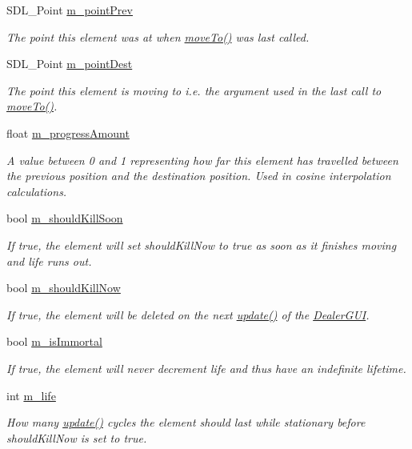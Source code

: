 \begin{DoxyCompactItemize}
S\-D\-L\-\_\-\-Point \hyperlink{classGUI_1_1Element_abc7a9c575911f5260732cdb0d63afb58}{m\-\_\-point\-Prev}
\begin{DoxyCompactList}\small\item\em The point this element was at when \hyperlink{classGUI_1_1Element_a6f7171736744f64faf428c17c74695df}{move\-To()} was last called. \end{DoxyCompactList}\item 
S\-D\-L\-\_\-\-Point \hyperlink{classGUI_1_1Element_a10ec38c0cf88fddea487644c1de45e1e}{m\-\_\-point\-Dest}
\begin{DoxyCompactList}\small\item\em The point this element is moving to i.\-e. the argument used in the last call to \hyperlink{classGUI_1_1Element_a6f7171736744f64faf428c17c74695df}{move\-To()}. \end{DoxyCompactList}\item 
float \hyperlink{classGUI_1_1Element_ae695e5eedb37b27ef5d8542a15908f1e}{m\-\_\-progress\-Amount}
\begin{DoxyCompactList}\small\item\em A value between 0 and 1 representing how far this element has travelled between the previous position and the destination position. Used in cosine interpolation calculations. \end{DoxyCompactList}\item 
bool \hyperlink{classGUI_1_1Element_a5a4b537de0a51fa11eb4c59b43980092}{m\-\_\-should\-Kill\-Soon}
\begin{DoxyCompactList}\small\item\em If true, the element will set should\-Kill\-Now to true as soon as it finishes moving and life runs out. \end{DoxyCompactList}\item 
bool \hyperlink{classGUI_1_1Element_ac3c14a4ae96ff31f2e0a59b6ebc1d076}{m\-\_\-should\-Kill\-Now}
\begin{DoxyCompactList}\small\item\em If true, the element will be deleted on the next \hyperlink{classGUI_1_1Element_ac33ecb92a9f9cb810bea83f31e4c14c9}{update()} of the \hyperlink{classGUI_1_1DealerGUI}{Dealer\-G\-U\-I}. \end{DoxyCompactList}\item 
bool \hyperlink{classGUI_1_1Element_a724c299bdb208b5ee7812fa1827de631}{m\-\_\-is\-Immortal}
\begin{DoxyCompactList}\small\item\em If true, the element will never decrement life and thus have an indefinite lifetime. \end{DoxyCompactList}\item 
int \hyperlink{classGUI_1_1Element_a432a31b103b55c3c8d14636368b449d1}{m\-\_\-life}
\begin{DoxyCompactList}\small\item\em How many \hyperlink{classGUI_1_1Element_ac33ecb92a9f9cb810bea83f31e4c14c9}{update()} cycles the element should last while stationary before should\-Kill\-Now is set to true. \end{DoxyCompactList}\end{DoxyCompactItemize}


